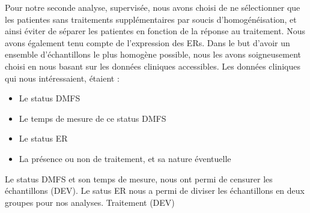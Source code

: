 			Pour notre seconde analyse, supervisée, nous avons choisi de ne sélectionner que les patientes sans traitements supplémentaires par soucis d'homogénéisation, et ainsi éviter de séparer les patientes en fonction de la réponse au traitement.
			Nous avons également tenu compte de l'expression des \aclp{ER}.
			Dans le but d'avoir un ensemble d'échantillons le plus homogène possible, nous les avons soigneusement choisi en nous basant sur les données cliniques accessibles.
			Les données cliniques qui nous intéressaient, étaient :
			\begin{itemize}
				\item Le status \acs{DMFS}
				\item Le temps de mesure de ce status \acs{DMFS}
				\item Le status \acs{ER}
				\item La présence ou non de traitement, et sa nature éventuelle
			\end{itemize}

			Le status \acs{DMFS} et son temps de mesure, nous ont permi de censurer les échantillons (DEV).
			Le satus \acs{ER} nous a permi de diviser les échantillons en deux groupes pour nos analyses.
			Traitement (DEV)

